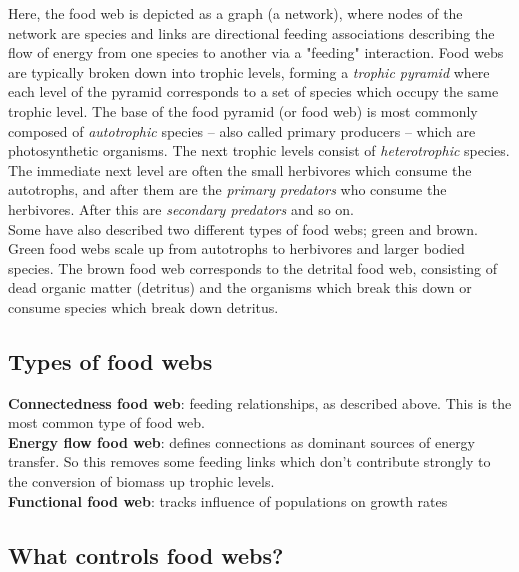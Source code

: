 \documentclass[12pt]{article}
\begin{document}
Here, the food web is depicted as a graph (a network), where nodes of the network are species and links are directional feeding associations describing the flow of energy from one species to another via a "feeding" interaction. Food webs are typically broken down into trophic levels, forming a \textit{trophic pyramid} where each level of the pyramid corresponds to a set of species which occupy the same trophic level. The base of the food pyramid (or food web) is most commonly composed of \textit{autotrophic} species -- also called primary producers -- which are photosynthetic organisms. The next trophic levels consist of \textit{heterotrophic} species. The immediate next level are often the small herbivores which consume the autotrophs, and after them are the \textit{primary predators} who consume the herbivores. After this are \textit{secondary predators} and so on. \\ 


Some have also described two different types of food webs; green and brown. Green food webs scale up from autotrophs to herbivores and larger bodied species. The brown food web corresponds to the detrital food web, consisting of dead organic matter (detritus) and the organisms which break this down or consume species which break down detritus. 





\bigskip
\subsection*{Types of food webs}

\textbf{Connectedness food web}: feeding relationships, as described above. This is the most common type of food web. \\


\textbf{Energy flow food web}: defines connections as dominant sources of energy transfer. So this removes some feeding links which don't contribute strongly to the conversion of biomass up trophic levels. \\

\textbf{Functional food web}: tracks influence of populations on growth rates \\














\bigskip
\subsection*{What controls food webs?}
\end{document}
